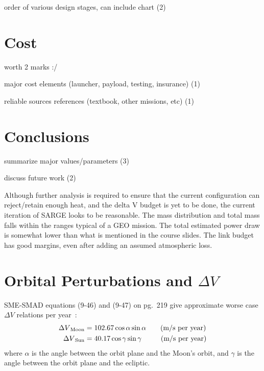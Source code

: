 \documentclass[9pt]{article}
\begin{document}
order of various design stages, can include chart (2)

\section{Cost}
worth 2 marks :/

major cost elements (launcher, payload, testing, insurance) (1)

reliable sources references (textbook, other missions, etc) (1)


\section{Conclusions}
summarize major values/parameters (3)

discuss future work (2)

Although further analysis is required to ensure that the current configuration can reject/retain enough heat, and the delta V budget is yet to be done, the current iteration of SARGE looks to be reasonable.
The mass distribution and total mass falls within the ranges typical of a GEO mission.
The total estimated power draw is somewhat lower than what is mentioned in the course slides.
The link budget has good margins, even after adding an assumed atmospheric loss.



\clearpage
\appendix

\printbibliography
\clearpage
\section{Orbital Perturbations and $\Delta V$}\label{app:orbpert}

SME-SMAD equations (9-46) and (9-47) on pg.~219 give approximate worse case $\Delta V$ relations per year~\cite{sme}:
\begin{align}
  {\Delta V}_\text{Moon} &= 102.67\cos\alpha\sin\alpha\hspace{2em}\text{(m/s per year)}\\
  {\Delta V}_\text{Sun} &= 40.17\cos\gamma\sin\gamma\hspace{2.7em}\text{(m/s per year)}
\end{align}
where $\alpha$ is the angle between the orbit plane and the Moon's orbit, and $\gamma$ is the angle between the orbit plane and the ecliptic.
\end{document}
